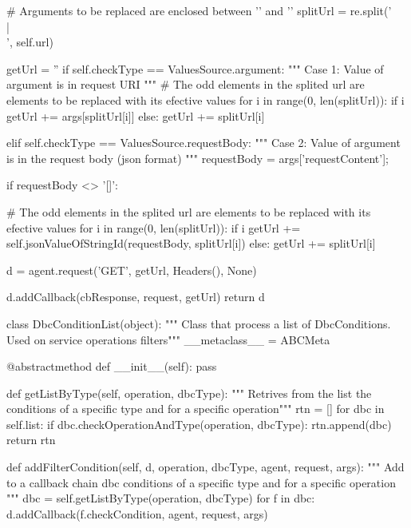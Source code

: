         # Arguments to be replaced are enclosed between '{' and '}'
        splitUrl = re.split('\\{|\\}', self.url)
        
        getUrl = ''
        if self.checkType == ValuesSource.argument:
            """ Case 1: Value of argument is in request URI """
            # The odd elements in the splited url are elements to be replaced with its efective values
            for i in range(0, len(splitUrl)):
                if i %
                    getUrl += args[splitUrl[i]]
                else:
                    getUrl += splitUrl[i]
                    
        elif self.checkType == ValuesSource.requestBody:
            """ Case 2: Value of argument is in the request body (json format) """
            requestBody = args['requestContent'];
            
            if requestBody <> '[]':
                
                # The odd elements in the splited url are elements to be replaced with its efective values
                for i in range(0, len(splitUrl)):
                    if i %
                        getUrl += self.jsonValueOfStringId(requestBody, splitUrl[i])
                    else:
                        getUrl += splitUrl[i]
                
        
        d = agent.request('GET', getUrl, Headers({}), None)
            
        d.addCallback(cbResponse, request, getUrl)
        return d



class DbcConditionList(object):
    """ Class that process a list of DbcConditions. Used on service operations filters"""
    __metaclass__ = ABCMeta
    
    @abstractmethod
    def __init__(self): pass
    
    def getListByType(self, operation, dbcType):
        """ Retrives from the list the conditions of a specific type and for a specific operation"""
        rtn = []
        for dbc in self.list:
            if dbc.checkOperationAndType(operation, dbcType):
                rtn.append(dbc)
        return rtn
     
    def addFilterCondition(self, d, operation, dbcType, agent, request, args):
        """ Add to a callback chain dbc conditions of a specific type and for a specific operation """
        dbc = self.getListByType(operation, dbcType)
        for f in dbc:
            d.addCallback(f.checkCondition, agent, request, args)
